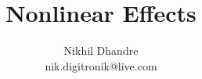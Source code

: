 \documentclass{beamer}
\begin{document}
\sffamily 
\bfseries

\title[Nonlinear Effects \hspace{2cm} Optical N/W]{Nonlinear Effects}
\author[\insertframenumber-\inserttotalframenumber \hspace{3cm} NIKHIL 
DHANDRE]{Nikhil Dhandre \\nik.digitronik@live.com\\}

\begin{frame}
  \titlepage
\end{frame}

\begin{frame}
 \frametitle{}
\end{frame}
\end{document}
